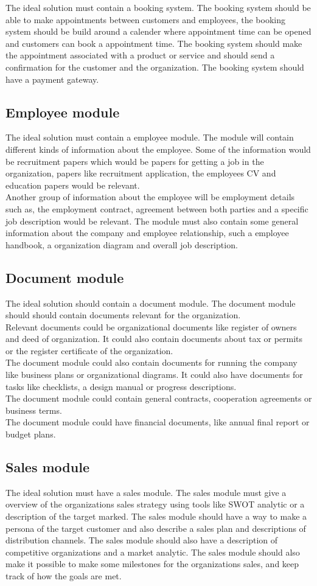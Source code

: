The ideal solution must contain a booking system. The booking system should be able to make appointments between customers and employees, the booking system should be build around a calender where appointment time can be opened and customers can book a appointment time. The booking system should make the appointment associated with a product or service and should send a confirmation for the customer and the organization. The booking system should have a payment gateway.

\subsection{Employee module}
The ideal solution must contain a employee module. The module will contain different kinds of information about the employee. Some of the information would be recruitment papers which would be papers for getting a job in the organization, papers like recruitment application, the employees CV and education papers would be relevant. \\
Another group of information about the employee will be employment details such as, the employment contract, agreement between both parties and a specific job description would be relevant. The module must also contain some general information about the company and employee relationship, such a employee handbook, a organization diagram and overall job description.

\subsection{Document module}
The ideal solution should contain a document module. The document module should should contain documents relevant for the organization.\\
Relevant documents could be organizational documents like register of owners and deed of organization. It could also contain documents about tax or permits or the register certificate of the organization.\\
The document module could also contain documents for running the company like business plans or organizational diagrams. It could also have documents for tasks like checklists, a design manual or progress descriptions.\\
The document module could contain general contracts, cooperation agreements or business terms.\\
The document module could have financial documents, like annual final report or budget plans.

\subsection{Sales module}
The ideal solution must have a sales module. The sales module must give a overview of the organizations sales strategy using tools like SWOT analytic or a description of the target marked. The sales module should have a way to make a persona of the target customer and also describe a sales plan and descriptions of distribution channels. The sales module should also have a description of competitive organizations and a market analytic. The sales module should also make it possible to make some milestones for the organizations sales, and keep track of how the goals are met.